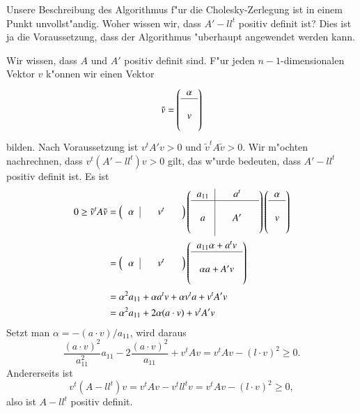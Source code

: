 {\small
Unsere Beschreibung des Algorithmus f"ur die Cholesky-Zerlegung ist in
einem Punkt unvollst"andig. Woher wissen wir, dass $A'-ll^t$ positiv
definit ist? Dies ist ja die Voraussetzung, dass der Algorithmus
"uberhaupt angewendet werden kann.

Wir wissen, dass $A$ und $A'$ positiv definit sind. F"ur jeden $n-1$-dimensionalen
Vektor $v$ k"onnen wir einen Vektor
\[
\tilde v=\left(
\begin{tabular}{c}
$\alpha$\\
\hline
$\mathstrut$\\
$v$\\
$\mathstrut$
\end{tabular}
\right)
\]
bilden. Nach Voraussetzung ist $v^tA'v>0$ und $\tilde v^tA\tilde v>0$.
Wir m"ochten nachrechnen, dass $v^t(A'-ll^t)v>0$ gilt, das w"urde bedeuten,
dass $A'-ll^t$ positiv definit ist.
Es ist
\begin{align*}
0\ge
\tilde v^tA\tilde v
&=
\left(
\begin{tabular}{>{$}c<{$}|>{$}c<{$}>{$}c<{$}>{$}c<{$}}
\alpha&&v^t&
\end{tabular}
\right)
\left(
\begin{tabular}{>{$}c<{$}|>{$}c<{$}>{$}c<{$}>{$}c<{$}}
a_{11}&&a^t&\\
\hline
&&&\\
a&&A'&\\
&&&
\end{tabular}
\right)
\left(
\begin{tabular}{>{$}c<{$}}
\alpha\\
\hline
\mathstrut\\
v\\
\mathstrut
\end{tabular}
\right)
\\
&=
\left(
\begin{tabular}{>{$}c<{$}|>{$}c<{$}>{$}c<{$}>{$}c<{$}}
\alpha&&v^t&
\end{tabular}
\right)
\left(
\begin{tabular}{>{$}c<{$}}
a_{11}\alpha+a^tv\\
\hline
\\
\alpha a+A'v\\
\\
\end{tabular}
\right)
\\
&=\alpha^2a_{11}+\alpha a^tv+\alpha v^ta+v^tA'v
\\
&=\alpha^2a_{11}+2\alpha (a\cdot v)+v^tA'v
\end{align*}
Setzt man $\alpha=-(a\cdot v)/a_{11}$, wird daraus
\[
\frac{(a\cdot v)^2}{a_{11}^2}a_{11}-2\frac{(a\cdot v)^2}{a_{11}}+v^tAv
=v^tAv-(l\cdot v)^2\ge 0.
\]
Andererseits ist
\[
v^t(A-ll^t)v=v^tAv-v^tll^tv=v^tAv-(l\cdot v)^2\ge 0,
\]
also ist $A-ll^t$ positiv definit.
}

